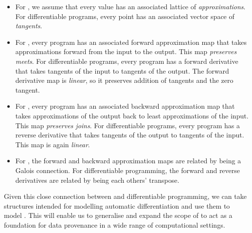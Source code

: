 \begin{itemize}
\item For \GPS, we assume that every value has an associated lattice of {\em approximations}. For differentiable programs, every point has an associated vector space of {\em tangents}.
\item For \GPS, every program has an associated forward approximation map that takes approximations forward from the input to the output. This map {\em preserves meets}. For differentiable programs, every program has a forward derivative that takes tangents of the input to tangents of the output. The forward derivative map is {\em linear}, so it preserves addition of tangents and the zero tangent.
\item For \GPS, every program has an associated backward approximation map that takes approximations of the output back to least approximations of the input. This map {\em preserves joins}. For differentiable programs, every program has a reverse derivative that takes tangents of the output to tangents of the input. This map is again {\em linear}.
\item For \GPS, the forward and backward approximation maps are related by being a Galois connection. For differentiable programming, the forward and reverse derivatives are related by being each others' transpose.
\end{itemize}

Given this close connection between \GPS and differentiable programming, we can take structures intended for modelling automatic differentiation and use them to model \GPS. This will enable us to generalise and expand the scope of \GPS to act as a foundation for data provenance in a wide range of computational settings.
